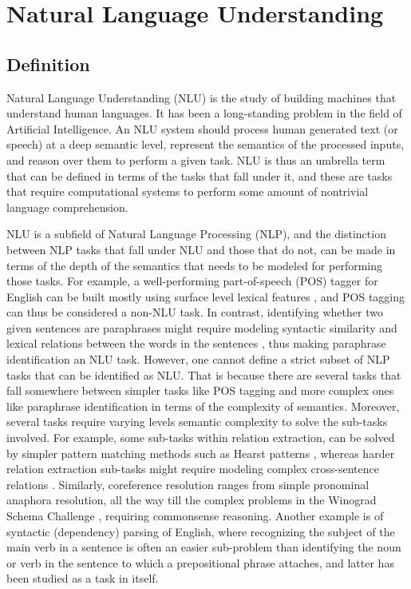 \section{Natural Language Understanding} \subsection{Definition} Natural Language Understanding
(NLU) is the study of building machines that understand human languages. It has been a long-standing
problem in the field of Artificial Intelligence. An NLU system should process human generated text
(or speech) at a deep semantic level, represent the semantics of the processed inputs, and reason
over them to perform a given task. NLU is thus an umbrella term that can be defined in terms of the
tasks that fall under it, and these are tasks that require computational systems to perform some
amount of nontrivial language comprehension.

NLU is a subfield of Natural Language Processing (NLP), and the distinction between NLP tasks that
fall under NLU and those that do not, can be made in terms of the depth of the semantics that needs
to be modeled for performing those tasks.  For example, a well-performing part-of-speech (POS)
tagger for English can be built mostly using surface level lexical features
\citep{toutanova2003feature}, and POS tagging can thus be considered a non-NLU task. In contrast,
identifying whether two given sentences are paraphrases might require modeling syntactic similarity
and lexical relations between the words in the sentences \citep{das2009paraphrase}, thus making
paraphrase identification an NLU task. However, one cannot define a strict subset of NLP tasks that
can be identified as NLU\@. That is because there are several tasks that fall somewhere between
simpler tasks like POS tagging and more complex ones like paraphrase identification in terms of the
complexity of semantics.  Moreover, several tasks require varying levels semantic complexity to
solve the sub-tasks involved.
For example, some sub-tasks within relation extraction, can be solved by simpler pattern matching
methods such as Hearst patterns \citep{hearst1992automatic}, whereas harder relation extraction  
sub-tasks might require modeling complex cross-sentence relations \citep{peng2017cross}.
Similarly, coreference resolution ranges from simple pronominal anaphora resolution, all the way till
the complex problems in the Winograd Schema Challenge \citep{levesque2012winograd}, requiring
commonsense reasoning. Another example is of syntactic (dependency) parsing of English, where recognizing
the subject of the main verb in a sentence is often an easier sub-problem than identifying the noun or
verb in the sentence to which a prepositional phrase attaches, and latter has been studied as a task
in itself.

